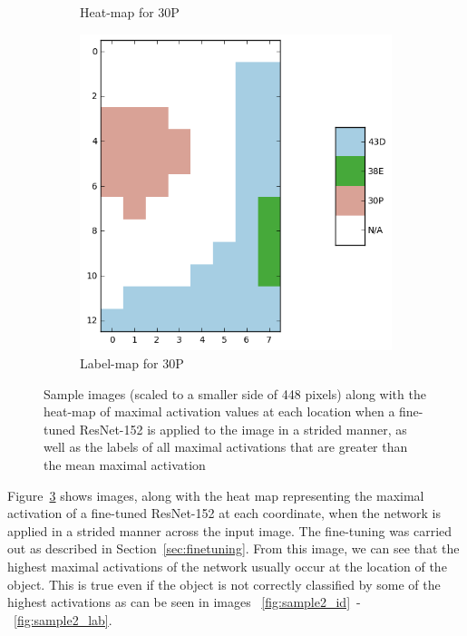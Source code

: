 \begin{figure}
\begin{subfigure}[b]{0.3\textwidth}
\caption{Heat-map for 30P\label{fig:sample3_hm}}
\end{subfigure}
\begin{subfigure}[b]{0.3\textwidth}
\includegraphics[width=\textwidth]{img/sample3_labels.png}
\caption{Label-map for 30P\label{fig:sample3_lab}}
\end{subfigure}
\caption{Sample images (scaled to a smaller side of 448 pixels)
along with the heat-map of maximal activation values
at each location when a fine-tuned ResNet-152 is applied to the image in a
strided manner, as well as the labels of all maximal activations that are
greater than the mean maximal activation\label{fig:heatmaps}}
\end{figure}

Figure~\ref{fig:heatmaps} shows images, along with the heat map
representing the maximal activation of a fine-tuned ResNet-152 at
each coordinate, when the network is applied in a strided manner
across the input image. The fine-tuning was carried out as described in
Section~\ref{sec:finetuning}.
From this image, we can see that the highest maximal
activations of the network usually occur at the location of the object.
This is true even if the object is not correctly classified by some of
the highest activations as can be seen in images
~\ref{fig:sample2_id}~-~\ref{fig:sample2_lab}.

